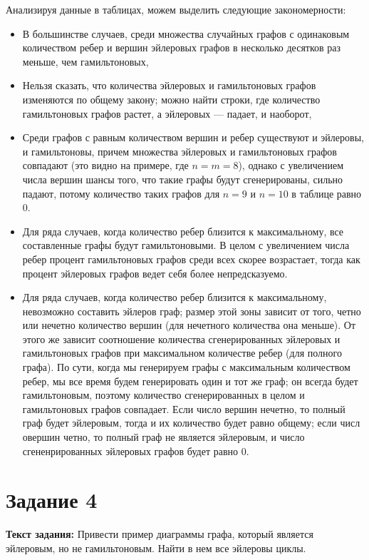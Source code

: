 \documentclass[12pt]{article}
\begin{document}
	Анализируя данные в таблицах, можем выделить следующие закономерности:
	\begin{itemize}
		\item В большинстве случаев, среди множества случайных графов с одинаковым количеством ребер и вершин эйлеровых графов в несколько десятков раз меньше, чем гамильтоновых,
		\item Нельзя сказать, что количества эйлеровых и гамильтоновых графов изменяются по общему закону; можно найти строки, где количество гамильтоновых графов растет, а эйлеровых --- падает, и наоборот,
		\item Среди графов с равным количеством вершин и ребер существуют и эйлеровы, и гамильтоновы, причем множества эйлеровых и гамильтоновых графов совпадают (это видно на примере, где $n = m = 8$), однако с увеличением числа вершин шансы того, что такие графы будут сгенерированы, сильно падают, потому количество таких графов для $n = 9$ и $n = 10$ в таблице равно 0.
		\item Для ряда случаев, когда количество ребер близится к максимальному, все составленные графы будут гамильтоновыми. В целом с увеличением числа ребер процент гамильтоновых графов среди всех скорее возрастает, тогда как процент эйлеровых графов ведет себя более непредсказуемо.
		\item Для ряда случаев, когда количество ребер близится к максимальному, невозможно составить эйлеров граф; размер этой зоны зависит от того, четно или нечетно количество вершин (для нечетного количества она меньше). От этого же зависит соотношение количества сгенерированных эйлеровых и гамильтоновых графов при максимальном количестве ребер (для полного графа). По сути, когда мы генерируем графы с максимальным количеством ребер, мы все время будем генерировать один и тот же граф; он всегда будет гамильтоновым, поэтому количество сгенерированных в целом и гамильтоновых графов совпадает. Если число вершин нечетно, то полный граф будет эйлеровым, тогда и их количество будет равно общему; если числ овершин четно, то полный граф не является эйлеровым, и число сгененрированных эйлеровых графов будет равно 0.
	\end{itemize}
	
	\section{Задание 4}
	\label{task4}

	{\bf Текст задания:} Привести пример диаграммы графа, который является эйлеровым, но не гамильтоновым. Найти в нем все эйлеровы циклы. 
	
\end{document}
